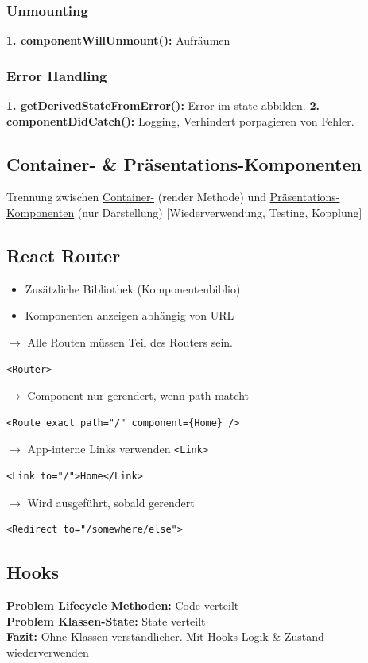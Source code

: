 \subsubsection{Unmounting}
\textbf{1. componentWillUnmount():} Aufräumen

\subsubsection{Error Handling}
\textbf{1. getDerivedStateFromError():} Error im state abbilden.
\textbf{2. componentDidCatch():} Logging, Verhindert porpagieren von Fehler.

\subsection{Container- \& Präsentations-Komponenten}
Trennung zwischen \underline{Container-} (render Methode) und \underline{Präsentations-} \underline{Komponenten} (nur Darstellung) [Wiederverwendung, Testing, Kopplung]

\subsection{React Router}
\begin{itemize}
    \item Zusätzliche Bibliothek (Komponentenbiblio)
    \item Komponenten anzeigen abhängig von URL
\end{itemize}

$\rightarrow$ Alle Routen müssen Teil des Routers sein.
\begin{lstlisting}
<Router>
\end{lstlisting}

$\rightarrow$ Component nur gerendert, wenn path matcht
\begin{lstlisting}
<Route exact path="/" component={Home} />
\end{lstlisting}

$\rightarrow$ App-interne Links verwenden \texttt{\tiny <Link>}
\begin{lstlisting}
<Link to="/">Home</Link>
\end{lstlisting}

$\rightarrow$ Wird ausgeführt, sobald gerendert
\begin{lstlisting}
<Redirect to="/somewhere/else">
\end{lstlisting}

\subsection{Hooks}
\textbf{Problem Lifecycle Methoden:} Code verteilt\\
\textbf{Problem Klassen-State:} State verteilt\\
\textbf{Fazit:} Ohne Klassen verständlicher. Mit Hooks Logik \& Zustand wiederverwenden

